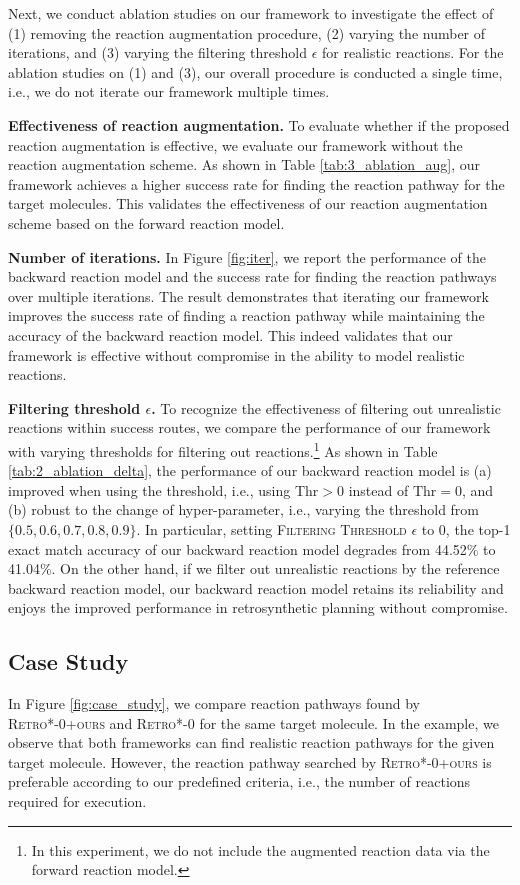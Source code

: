 Next, we conduct ablation studies on our framework to investigate the effect of (1) removing the reaction augmentation procedure, (2) varying the number of iterations, and (3) varying the filtering threshold $\epsilon$ for realistic reactions. 
For the ablation studies on (1) and (3), our overall procedure is conducted a single time, i.e., we do not iterate our framework multiple times.


\textbf{Effectiveness of reaction augmentation.}
To evaluate whether if the proposed reaction augmentation is effective, we evaluate our framework without the reaction augmentation scheme. As shown in Table \ref{tab:3_ablation_aug}, our framework achieves a higher success rate for finding the reaction pathway for the target molecules. This validates the effectiveness of our reaction augmentation scheme based on the forward reaction model. 




\textbf{Number of iterations.} 
In Figure \ref{fig:iter}, we report the performance of the backward reaction model and the success rate for finding the reaction pathways over multiple iterations. The result demonstrates that iterating our framework improves the success rate of finding a reaction pathway while maintaining the accuracy of the backward reaction model. This indeed validates that our framework is effective without compromise in the ability to model realistic reactions.



\textbf{Filtering threshold $\epsilon$.}
\label{ablation:filter}
To recognize the effectiveness of filtering out unrealistic reactions within success routes, we compare the performance of our framework with varying thresholds for filtering out reactions.\footnote{In this experiment, we do not include the augmented reaction data via the forward reaction model.} 
As shown in Table \ref{tab:2_ablation_delta}, the performance of our backward reaction model is (a) improved when using the threshold, i.e., using Thr$>$0 instead of Thr$=$0, and (b) robust to the change of hyper-parameter, i.e., varying the threshold from $\{0.5, 0.6, 0.7, 0.8, 0.9\}$. In particular, setting \textsc{Filtering Threshold} $\epsilon$ to 0, the top-1 exact match accuracy of our backward reaction model degrades from 44.52\% to 41.04\%. On the other hand, if we filter out unrealistic reactions by the reference backward reaction model, our backward reaction model retains its reliability and enjoys the improved performance in retrosynthetic planning without compromise.


\subsection{Case Study}
In Figure \ref{fig:case_study}, we compare reaction pathways found by \textsc{Retro*-0+ours} and \textsc{Retro*-0} for the same target molecule. In the example, we observe that both frameworks can find realistic reaction pathways for the given target molecule. However, the reaction pathway searched by \textsc{Retro*-0+ours} is preferable according to our predefined criteria, i.e., the number of reactions required for execution.